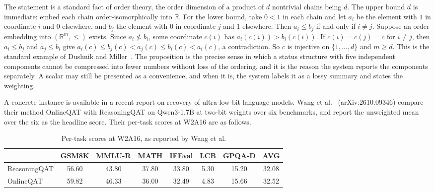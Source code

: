 The statement is a standard fact of order theory, the order dimension of a product of $d$ nontrivial chains being $d$. The upper bound $d$ is immediate: embed each chain order-isomorphically into $\mathbb{R}$. For the lower bound, take $0<1$ in each chain and let $a_i$ be the element with $1$ in coordinate $i$ and $0$ elsewhere, and $b_j$ the element with $0$ in coordinate $j$ and $1$ elsewhere. Then $a_i \le b_j$ if and only if $i \ne j$. Suppose an order embedding into $(\mathbb{R}^m,\le)$ exists. Since $a_i \not\le b_i$, some coordinate $c(i)$ has $a_i(c(i)) > b_i(c(i))$. If $c(i)=c(j)=c$ for $i\neq j$, then $a_i \le b_j$ and $a_j\le b_i$ give $a_i(c)\le b_j(c)<a_j(c)\le b_i(c)<a_i(c)$, a contradiction. So $c$ is injective on $\{1,\dots,d\}$ and $m\ge d$. This is the standard example of Dushnik and Miller~\cite{DM41}. The proposition is the precise sense in which a status structure with five independent components cannot be compressed into fewer numbers without loss of the ordering, and it is the reason the system reports the components separately. A scalar may still be presented as a convenience, and when it is, the system labels it as a lossy summary and states the weighting.

A concrete instance is available in a recent report on recovery of ultra-low-bit language models. Wang et al.\ \cite{Wang26} (arXiv:2610.09346) compare their method OnlineQAT with ReasoningQAT on Qwen3-1.7B at two-bit weights over six benchmarks, and report the unweighted mean over the six as the headline score. Their per-task scores at W2A16 are as follows.

\begin{table}[ht]
\centering
\small
\begin{tabular}{@{}lccccccc@{}}
\toprule
 & GSM8K & MMLU-R & MATH & IFEval & LCB & GPQA-D & AVG \\
\midrule
ReasoningQAT & 56.60 & 43.80 & 37.80 & 33.80 & 5.30 & 15.20 & 32.08 \\
OnlineQAT & 59.82 & 46.33 & 36.00 & 32.49 & 4.83 & 15.66 & 32.52 \\
\bottomrule
\end{tabular}
\caption{Per-task scores at W2A16, as reported by Wang et al.}
\label{tab:onlineqat}
\end{table}

